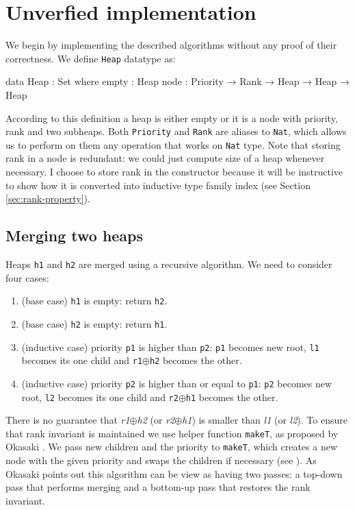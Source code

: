 \section[Unverfied implementation]{Unverfied implementation} \label{sec:no-proofs}
We begin by implementing the described algorithms without any proof of their correctness. We define \texttt{Heap} datatype as:

\begin{code}
data Heap : Set where
  empty : Heap
  node  : Priority → Rank → Heap → Heap → Heap
\end{code}
\noindent
According to this definition a heap is either empty or it is a node with priority, rank and two subheaps. Both \texttt{Priority} and \texttt{Rank} are aliases to \texttt{Nat}, which allows us to perform on them any operation that works on \texttt{Nat} type. Note that storing rank in a node is redundant: we could just compute size of a heap whenever necessary. I choose to store rank in the constructor because it will be instructive to show how it is converted into inductive type family index (see Section \ref{sec:rank-property}).

\subsection{Merging two heaps}\label{sec:twopass-merge}

Heaps \texttt{h1} and \texttt{h2} are merged using a recursive algorithm. We need to consider four cases:

\begin{enumerate}
 \item (base case) \texttt{h1} is empty: return \texttt{h2}.
 \item (base case) \texttt{h2} is empty: return \texttt{h1}.
 \item (inductive case) priority \texttt{p1} is higher than \texttt{p2}: \texttt{p1} becomes new root, \texttt{l1} becomes its one child and \texttt{r1}$\oplus$\texttt{h2} becomes the other.
 \item (inductive case) priority \texttt{p2} is higher than or equal to \texttt{p1}: \texttt{p2} becomes new root, \texttt{l2} becomes its one child and \texttt{r2}$\oplus$\texttt{h1} becomes the other.
\end{enumerate}
\noindent
There is no guarantee that \textit{r1}$\oplus$\textit{h2} (or \textit{r2}$\oplus$\textit{h1}) is smaller than \textit{l1} (or \textit{l2}). To ensure that rank invariant is maintained we use helper function \texttt{makeT}, as proposed by Okasaki \cite{Oka99}. We pass new children and the priority to \texttt{makeT}, which creates a new node with the given priority and swaps the children if necessary (see ). As Okasaki points out this algorithm can be view as having two passes: a top-down pass that performs merging and a bottom-up pass that restores the rank invariant.

